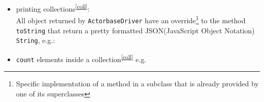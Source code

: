 \documentclass{scalatekids-article}
\begin{document}
{\begin{itemize}
    the \verb=drop= inside an \verb=ActorbaseCollection= object:
    and finally \verb=drop= inside an \verb=ActorbaseCollectionMap=, it takes a
    vararg of \verb=String= representing a sequence of collections\textsuperscript{\ref{coll}} to be removed
    e.g.:
  \item printing collections\textsuperscript{\ref{coll}}:\\All object returned by \verb=ActorbaseDriver=
    have an override\footnote{Specific implementation of a method in a subclass that
      is already provided by one of its superclasses} to the method \verb=toString=
    that return a pretty formatted JSON(JavaScript Object Notation) \verb=String=, e.g.:
  \item \verb=count= elements inside a collection\textsuperscript{\ref{coll}} e.g.


\end{itemize}}
\end{document}
